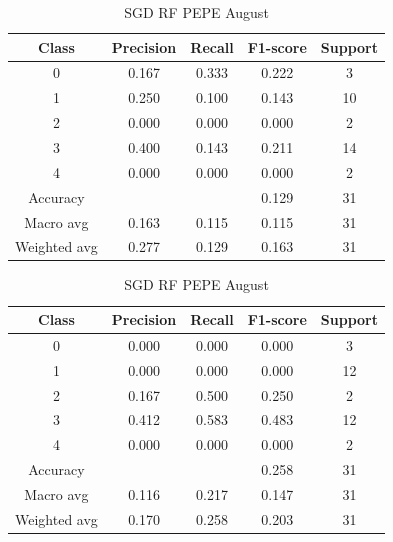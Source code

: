 \begin{enumerate}
\begin{enumerate}
                \begin{table}[H]
                \centering
                \scriptsize
                \begin{minipage}{0.48\textwidth}
                \centering
                \begin{tabular}{c|cccc}
                \hline
                Class & Precision & Recall & F1-score & Support \\
                \hline
                0 & 0.167 & 0.333 & 0.222 & 3 \\
                1 & 0.250 & 0.100 & 0.143 & 10 \\
                2 & 0.000 & 0.000 & 0.000 & 2 \\
                3 & 0.400 & 0.143 & 0.211 & 14 \\
                4 & 0.000 & 0.000 & 0.000 & 2 \\
                \hline
                Accuracy &       &      & 0.129 & 31 \\
                Macro avg & 0.163 & 0.115 & 0.115 & 31 \\
                Weighted avg & 0.277 & 0.129 & 0.163 & 31 \\
                \hline
                \end{tabular}
                \caption{SGD RF DOGE August}
                \label{tab:classifier_2_report_sgd_rf_doge_filtered_aug}
                \end{minipage}
                \hfill
                \begin{minipage}{0.48\textwidth}
                \centering
                \begin{tabular}{c|cccc}
                \hline
                Class & Precision & Recall & F1-score & Support \\
                \hline
                0 & 0.000 & 0.000 & 0.000 & 3 \\
                1 & 0.000 & 0.000 & 0.000 & 12 \\
                2 & 0.167 & 0.500 & 0.250 & 2 \\
                3 & 0.412 & 0.583 & 0.483 & 12 \\
                4 & 0.000 & 0.000 & 0.000 & 2 \\
                \hline
                Accuracy &       &      & 0.258 & 31 \\
                Macro avg & 0.116 & 0.217 & 0.147 & 31 \\
                Weighted avg & 0.170 & 0.258 & 0.203 & 31 \\
                \hline
                \end{tabular}
                \caption{SGD RF PEPE August}
                \label{tab:classifier_2_report_sgd_rf_pepe_filtered_aug}
                \end{minipage}
                

\end{table}
\end{enumerate}
\end{enumerate}
